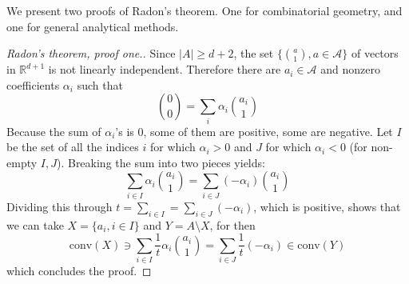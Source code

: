 We present two proofs of Radon's theorem. One for combinatorial geometry, and one for general analytical methods. 
\begin{proof}[Radon's theorem, proof one.]
    Since $\lvert A\rvert \geq d+2$, the set $\{{a\choose 1}, a\in \mathcal{A}\}$ of vectors in $\mathbb{R}^{d+1}$ is not linearly independent. Therefore there are $a_{i}\in \mathcal{A}$ and nonzero coefficients $\alpha_{i}$ such that 
    \begin{equation}
        {0 \choose 0} = \sum_{i} \alpha_{i} {a_{i}\choose 1}
    \end{equation}
    Because the sum of $\alpha_{i}$'s is $0$, some of them are positive, some are negative. Let $I$ be the set of all the indices $i$ for which $\alpha_{i}>0$ and $J$ for which $\alpha_{i}<0$ (for non-empty $I,J$). Breaking the sum into two pieces yields:
    \begin{equation}
        \sum_{i\in I} \alpha_{i} {a_{i}\choose 1} = \sum_{i\in J} (-\alpha_{i}) {a_{i}\choose 1}
    \end{equation}
    Dividing this through $t=\sum_{i\in I}=\sum_{i\in J}(-\alpha_{i})$, which is positive, shows that we can take $X=\{a_{i},i\in I\}$ and $Y=A\setminus X$, for then 
    \begin{equation}
        \mathrm{conv}(X) \ni \sum_{i\in I} \frac{1}{t} \alpha_{i} {a_{i}\choose 1} = \sum_{i\in J} \frac{1}{t} (-\alpha_{i})  \in \mathrm{conv}(Y)
    \end{equation}
    which concludes the proof. 
\end{proof}
